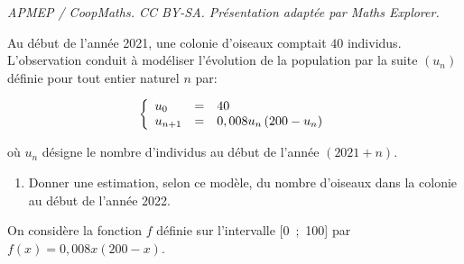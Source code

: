\documentclass[10pt]{article}
\begin{document}
\noindent\textit{APMEP / CoopMaths. CC BY-SA. Présentation adaptée par Maths Explorer.}\par\medskip
\medskip

Au début de l'année 2021, une colonie d'oiseaux comptait $40$ individus. L'observation conduit à modéliser l'évolution de la population par la suite $\left(u_n\right)$ définie pour tout entier naturel $n$ par:

\[\left\{\begin{array}{l c l}
u_0&=&40\\
u_{n+1}&=&0,008u_n\left(200 - u_n\right)
\end{array}\right.\]

où $u_n$ désigne le nombre d'individus au début de l'année $(2021+n)$.

\medskip


\begin{enumerate}
\item Donner une estimation, selon ce modèle, du nombre d'oiseaux dans la colonie au
début de l'année 2022.
\end{enumerate}

On considère la fonction $f$ définie sur l'intervalle [0~;~100] par $f(x) = 0,008x(200 - x)$.
\end{document}

